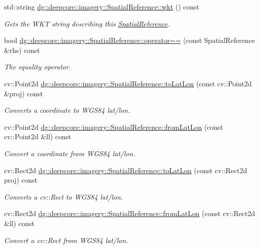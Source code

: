 \begin{DoxyCompactItemize}
std\+::string \hyperlink{group___imagery_module_ga8654dc584206ce3675ee3330a94c06c9}{dg\+::deepcore\+::imagery\+::\+Spatial\+Reference\+::wkt} () const 
\begin{DoxyCompactList}\small\item\em Gets the W\+KT string describing this \hyperlink{classdg_1_1deepcore_1_1imagery_1_1_spatial_reference}{Spatial\+Reference}. \end{DoxyCompactList}\item 
bool \hyperlink{group___imagery_module_ga2c033f8a8c0c70c1db52343f66cc3245}{dg\+::deepcore\+::imagery\+::\+Spatial\+Reference\+::operator==} (const Spatial\+Reference \&rhs) const 
\begin{DoxyCompactList}\small\item\em The equality operator. \end{DoxyCompactList}\item 
cv\+::\+Point2d \hyperlink{group___imagery_module_gad8d72dd386f86fd70fcd71197e408dfd}{dg\+::deepcore\+::imagery\+::\+Spatial\+Reference\+::to\+Lat\+Lon} (const cv\+::\+Point2d \&proj) const 
\begin{DoxyCompactList}\small\item\em Converts a coordinate to W\+G\+S84 lat/lon. \end{DoxyCompactList}\item 
cv\+::\+Point2d \hyperlink{group___imagery_module_gab9474c2105f1354b4139d5a905699f36}{dg\+::deepcore\+::imagery\+::\+Spatial\+Reference\+::from\+Lat\+Lon} (const cv\+::\+Point2d \&ll) const 
\begin{DoxyCompactList}\small\item\em Convert a coordinate from W\+G\+S84 lat/lon. \end{DoxyCompactList}\item 
cv\+::\+Rect2d \hyperlink{group___imagery_module_ga9d0268dbc9fbd5210fb0487915340737}{dg\+::deepcore\+::imagery\+::\+Spatial\+Reference\+::to\+Lat\+Lon} (const cv\+::\+Rect2d proj) const 
\begin{DoxyCompactList}\small\item\em Converts a cv\+::\+Rect to W\+G\+S84 lat/lon. \end{DoxyCompactList}\item 
cv\+::\+Rect2d \hyperlink{group___imagery_module_gaae5267f1271d5753680b57c8f2f99690}{dg\+::deepcore\+::imagery\+::\+Spatial\+Reference\+::from\+Lat\+Lon} (const cv\+::\+Rect2d \&ll) const 
\begin{DoxyCompactList}\small\item\em Convert a cv\+::\+Rect from W\+G\+S84 lat/lon. \end{DoxyCompactList}\item 

\end{DoxyCompactItemize}
